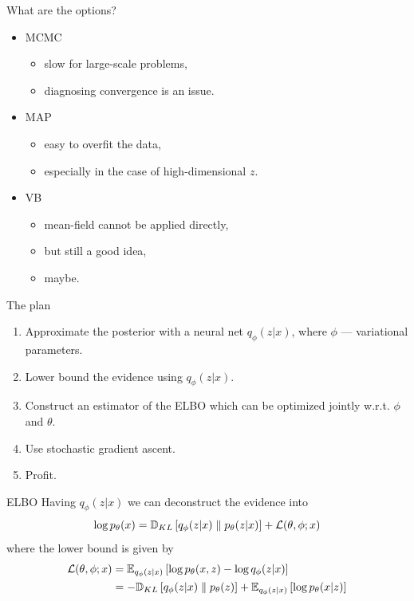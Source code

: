 \documentclass[unicode,11pt]{beamer}
\begin{document}
\begin{frame}{What are the options?}
  \begin{itemize}
  \item MCMC
    \begin{itemize}
    \item slow for large-scale problems,
    \item diagnosing convergence is an issue.
    \end{itemize}
  \item MAP
    \begin{itemize}
    \item easy to overfit the data,
    \item especially in the case of high-dimensional $z$.
    \end{itemize}
  \item VB
    \begin{itemize}
    \item mean-field cannot be applied directly,
    \item but still a good idea,
    \item maybe.
    \end{itemize}
  \end{itemize}
\end{frame}


\begin{frame}{The plan}
  \begin{enumerate}
  \item Approximate the posterior with a neural net
    $q_{\phi}(z|x)$, where $\phi$ --- variational parameters.
  \item Lower bound the evidence using $q_{\phi}(z|x)$.
  \item Construct an estimator of the ELBO which can be
    optimized jointly w.r.t. $\phi$ and $\theta$.
  \item Use stochastic gradient ascent.
  \item Profit.
  \end{enumerate}
\end{frame}


\begin{frame}{ELBO}
  Having $q_\phi(z|x)$ we can deconstruct the evidence into
  $$
  \log p_\theta(x) = \mathbb{D}_{KL}\left[ q_\phi(z|x) \parallel p_\theta(z|x) \right] + \mathcal{L}(\theta, \phi; x)
  $$
  where the lower bound is given by
  \begin{align*}
    \mathcal{L}(\theta, \phi; x)
    &= \E{q_\phi(z|x)}{\log p_\theta(x, z) - \log q_\phi(z|x)} \\
    &= -\KL{q_\phi (z|x)}{p_\theta(z)} + \E{q_\phi(z|x)}{\log p_\theta (x|z)}
  \end{align*}

\end{frame}
\end{document}
